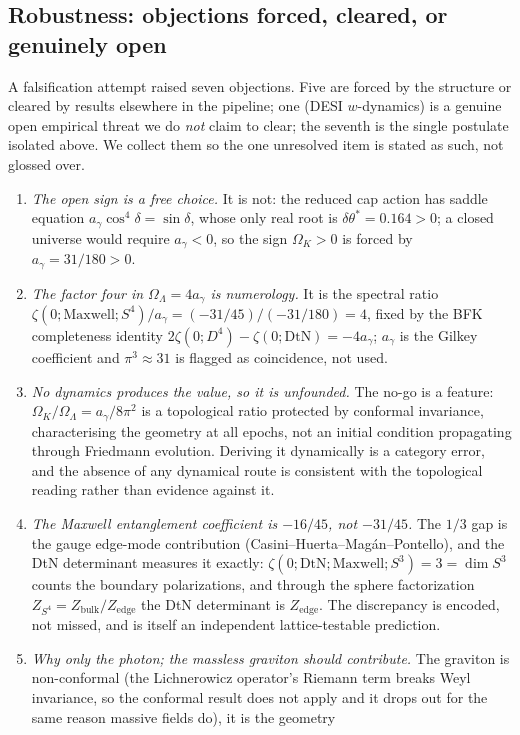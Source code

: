 \documentclass[11pt,a4paper]{article}
\theoremstyle{plain}
\theoremstyle{definition}
\theoremstyle{remark}
\newcommand{\Ok}{\Omega_K}
\newcommand{\OL}{\Omega_\Lambda}
\newcommand{\ag}{a_\gamma}
\newcommand{\dtheta}{\delta\theta}
\begin{document}
\subsection{Robustness: objections forced, cleared, or genuinely open}
A falsification attempt raised seven objections. Five are forced by the
structure or cleared by results elsewhere in the pipeline; one (DESI
$w$-dynamics) is a genuine open empirical threat we do \emph{not} claim to clear; the
seventh is the single postulate isolated above. We collect them so the one unresolved item is stated as such, not glossed over.
\begin{enumerate}[leftmargin=*,nosep]
\item \emph{The open sign is a free choice.} It is not: the reduced cap action has saddle equation
$\ag\cos^4\delta = \sin\delta$, whose only real root is $\dtheta^*=0.164>0$; a closed universe
would require $\ag<0$, so the sign $\Ok>0$ is forced by $\ag=31/180>0$.
\item \emph{The factor four in $\OL=4\ag$ is numerology.} It is the spectral ratio
$\zeta(0;\mathrm{Maxwell};S^4)/\ag = (-31/45)/(-31/180)=4$, fixed by the BFK completeness identity
$2\zeta(0;D^4)-\zeta(0;\mathrm{DtN})=-4\ag$; $\ag$ is the Gilkey coefficient and $\pi^3\approx 31$ is
flagged as coincidence, not used.
\item \emph{No dynamics produces the value, so it is unfounded.} The no-go is a feature:
$\Ok/\OL=\ag/8\pi^2$ is a topological ratio protected by conformal invariance, characterising the
geometry at all epochs, not an initial condition propagating through Friedmann evolution. Deriving
it dynamically is a category error, and the absence of any dynamical route is consistent with the
topological reading rather than evidence against it.
\item \emph{The Maxwell entanglement coefficient is $-16/45$, not $-31/45$.} The $1/3$ gap is the
gauge edge-mode contribution (Casini--Huerta--Mag\'an--Pontello), and the DtN determinant measures it
exactly: $\zeta(0;\mathrm{DtN};\mathrm{Maxwell};S^3)=3=\dim S^3$ counts the boundary polarizations,
and through the sphere factorization $Z_{S^4}=Z_{\mathrm{bulk}}/Z_{\mathrm{edge}}$ the DtN
determinant is $Z_{\mathrm{edge}}$. The discrepancy is encoded, not missed, and is itself an
independent lattice-testable prediction.
\item \emph{Why only the photon; the massless graviton should contribute.} The graviton is
non-conformal (the Lichnerowicz operator's Riemann term breaks Weyl invariance, so the conformal
result does not apply and it drops out for the same reason massive fields do), it is the geometry

\end{enumerate}
\end{document}
